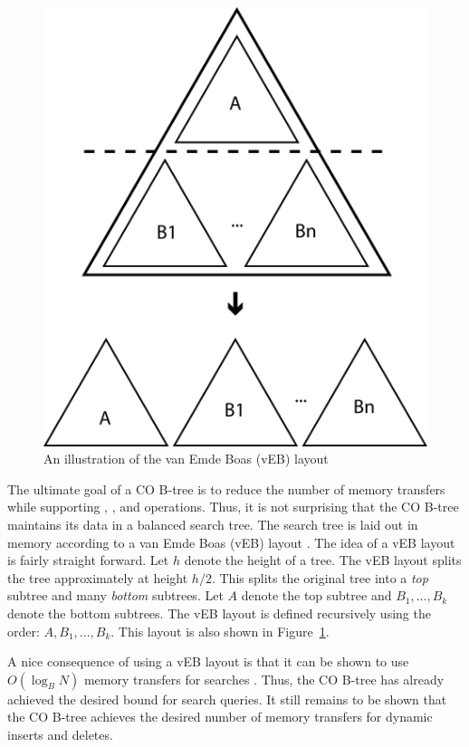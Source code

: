 \documentclass[preprint]{style}
\begin{document}
\begin{figure}

\begin{center}
	\includegraphics[width=0.8\columnwidth]{figures/veb.pdf}
\end{center}

\caption{An illustration of the van Emde Boas (vEB) layout}
\label{fig:veb}
\end{figure}

The ultimate goal of a CO B-tree is to reduce the number of memory transfers
while supporting \Search{}, \Insert{}, and \Delete{} operations. Thus, it is
not surprising that the CO B-tree maintains its data in a balanced search tree.
The search tree is laid out in memory according to a van Emde Boas (vEB) layout
\cite{veb1,veb2}. The idea of a vEB layout is fairly straight forward. Let $h$
denote the height of a tree. The vEB layout splits the tree approximately at
height $h/2$. This splits the original tree into a \textit{top} subtree and
many \textit{bottom} subtrees.  Let $A$ denote the top subtree and
$B_1,...,B_k$ denote the bottom subtrees.  The vEB layout is defined
recursively using the order: $A,B_1,...,B_k$. This layout is also shown in
Figure~\ref{fig:veb}.

A nice consequence of using a vEB layout is that it can be shown to use
$O(\log_{B}{N})$ memory transfers for searches \cite{veb1, veb2}. Thus, the CO
B-tree has already achieved the desired bound for search queries. It still
remains to be shown that the CO B-tree achieves the desired number of memory
transfers for dynamic inserts and deletes.
\end{document}
